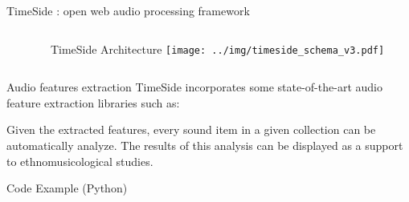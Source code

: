 \documentclass[final, hyperref, table]{beamer}
\begin{document}
\begin{frame}[containsverbatim]{}
\begin{columns}[T]
\begin{column}[T]{.49\linewidth}
\begin{block}{TimeSide : open web audio processing framework}
\begin{columns}[T]
\begin{column}{.35\linewidth}
  \end{column}

  \begin{column}[T]{0.6\linewidth}
    \begin{beamerboxesrounded}[shadow=true]{TimeSide Architecture}
       \centering
        \texttt{[image: ../img/timeside\_schema\_v3.pdf]}
      \end{beamerboxesrounded}

  \end{column}

\end{columns}

\begin{beamerboxesrounded}%
       [shadow=true]%
       {Audio features extraction}
  TimeSide incorporates some state-of-the-art audio feature extraction
  libraries such as:


  Given the extracted features, every sound item in a given collection
  can be automatically analyze. The results of this analysis can be
  displayed as a support to ethnomusicological studies. 
\end{beamerboxesrounded}






\end{block}

\begin{block}{Code Example (Python)}
\begin{columns}[T]
  \begin{column}[T]{0.6\linewidth}
    
  \end{column}
 

\end{columns}
\end{block}
\end{column}
\end{columns}
\end{frame}
\end{document}
